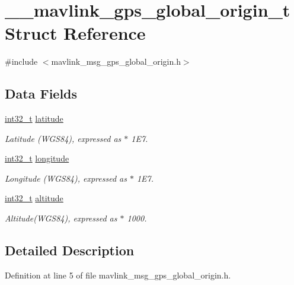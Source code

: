 \hypertarget{struct____mavlink__gps__global__origin__t}{\section{\-\_\-\-\_\-mavlink\-\_\-gps\-\_\-global\-\_\-origin\-\_\-t Struct Reference}
\label{struct____mavlink__gps__global__origin__t}
}


{\ttfamily \#include $<$mavlink\-\_\-msg\-\_\-gps\-\_\-global\-\_\-origin.\-h$>$}

\subsection*{Data Fields}
\begin{DoxyCompactItemize}
\item 
\hyperlink{group___n_a_m_e_gafd12020da5a235dfcf0c3c748fb5baed}{int32\-\_\-t} \hyperlink{struct____mavlink__gps__global__origin__t_ab78807fb15062419bf5452c3294235bc}{latitude}
\begin{DoxyCompactList}\small\item\em Latitude (W\-G\-S84), expressed as $\ast$ 1\-E7. \end{DoxyCompactList}\item 
\hyperlink{group___n_a_m_e_gafd12020da5a235dfcf0c3c748fb5baed}{int32\-\_\-t} \hyperlink{struct____mavlink__gps__global__origin__t_a52156dc446e0be0bc5cbf4247e194349}{longitude}
\begin{DoxyCompactList}\small\item\em Longitude (W\-G\-S84), expressed as $\ast$ 1\-E7. \end{DoxyCompactList}\item 
\hyperlink{group___n_a_m_e_gafd12020da5a235dfcf0c3c748fb5baed}{int32\-\_\-t} \hyperlink{struct____mavlink__gps__global__origin__t_a34577699f6c0ef2517eb8b16da733c15}{altitude}
\begin{DoxyCompactList}\small\item\em Altitude(\-W\-G\-S84), expressed as $\ast$ 1000. \end{DoxyCompactList}\end{DoxyCompactItemize}


\subsection{Detailed Description}


Definition at line 5 of file mavlink\-\_\-msg\-\_\-gps\-\_\-global\-\_\-origin.\-h.



